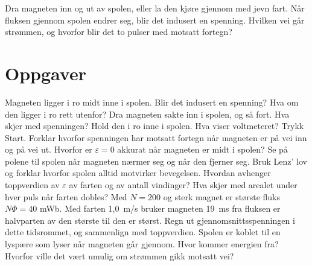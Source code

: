 \documentclass[11pt]{article}
\begin{document}

Dra magneten inn og ut av spolen, eller la den kjøre gjennom med jevn fart. Når fluksen gjennom spolen endrer seg, blir det indusert en spenning. Hvilken vei går strømmen, og hvorfor blir det to pulser med motsatt fortegn?

\section*{Oppgaver}

\begin{oppgaveliste}
\oppgave {}Magneten ligger i ro midt inne i spolen. Blir det indusert en spenning? Hva om den ligger i ro rett utenfor?
\svar
\oppgave {}Dra magneten sakte inn i spolen, og så fort. Hva skjer med spenningen? Hold den i ro inne i spolen. Hva viser voltmeteret?
\svar
\oppgave {}Trykk Start. Forklar hvorfor spenningen har motsatt fortegn når magneten er på vei inn og på vei ut. Hvorfor er $ε = 0$ akkurat når magneten er midt i spolen?
\svar
\oppgave {}Se på polene til spolen når magneten nærmer seg og når den fjerner seg. Bruk Lenz' lov og forklar hvorfor spolen alltid motvirker bevegelsen.
\svar
\oppgave {}Hvordan avhenger toppverdien av $ε$ av farten og av antall vindinger? Hva skjer med arealet under hver puls når farten dobles?
\svar
\oppgave {}Med $N = 200$ og sterk magnet er største fluks $NΦ = 40$ mWb. Med farten 1,0~m/s bruker magneten 19~ms fra fluksen er halvparten av den største til den er størst. Regn ut gjennomsnittsspenningen i dette tidsrommet, og sammenlign med toppverdien.
\svar
\oppgave {}Spolen er koblet til en lyspære som lyser når magneten går gjennom. Hvor kommer energien fra? Hvorfor ville det vært umulig om strømmen gikk motsatt vei?
\svar
\end{oppgaveliste}
\end{document}
